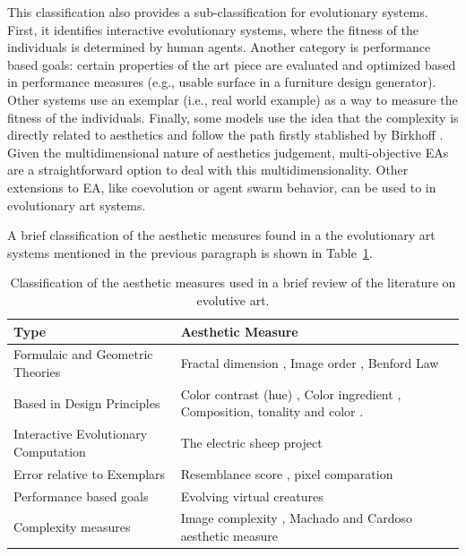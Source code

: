 \documentclass[a4paper,twoside]{article}
\begin{document}
This classification also provides a sub-classification for evolutionary systems. First, it identifies interactive evolutionary systems, where the fitness of the individuals is determined by human agents. Another category is performance based goals: certain properties of the art piece are evaluated and optimized based in performance measures (e.g., usable surface in a furniture design generator). Other systems use an exemplar (i.e., real world example) as a way to measure the fitness of the individuals. Finally, some models use the idea that the complexity is directly related to aesthetics and follow the path firstly stablished by Birkhoff \cite{birkhoff2003aesthetic}.  Given the multidimensional nature of aesthetics judgement, multi-objective EAs are a straightforward option to deal with this multidimensionality. Other extensions to EA, like coevolution or agent swarm behavior, can be used to in evolutionary art systems.

A brief classification of the aesthetic measures found in a the evolutionary art systems mentioned in the previous paragraph is shown in Table~\ref{table_class}.

\begin{table}[!t] 
\renewcommand{\arraystretch}{1.3} 
\caption{Classification of the aesthetic measures used in a brief review of the literature on evolutive art.} 
\label{table_class} 
\centering
\begin{tabularx}{\textwidth}{|l|X|}
\hline
Type & Aesthetic Measure \\ \hline
Formulaic and Geometric Theories & Fractal dimension \cite{den2010comparing}, Image order \cite{li2012investigating}, Benford Law \cite{del2005benford}\\ \hline
Based in Design Principles &  Color contrast (hue) \cite{den2012evolving},  Color ingredient \cite{li2012investigating}, Composition, tonality and color \cite{dipaola2009incorporating}.\\ \hline
Interactive Evolutionary Computation & The electric sheep project \cite{draves2006electric} \cite{ashlock2006evolutionary,moroni2000vox}\\ \hline
Error relative to Exemplars &  Resemblance score \cite{dipaola2009incorporating}, pixel comparation \cite{aguilar2008robotic}\\ \hline
Performance based goals & Evolving virtual creatures \cite{sims1994evolving} \\\hline
Complexity measures & Image complexity \cite{li2012investigating}, Machado and Cardoso aesthetic measure \cite{machado1998computing}\\ \hline
\end{tabularx}
\end{table}
\end{document}
